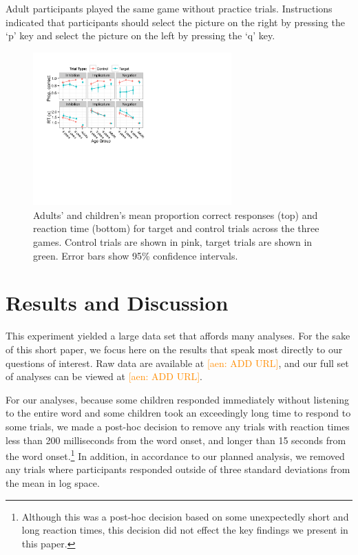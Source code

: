 \documentclass[10pt,letterpaper]{article}
\newcommand{\aen}[1]{\textcolor{DarkOrange}{[aen: #1]}}
\begin{document}
Adult participants played the same game without practice trials.  Instructions indicated that participants should select the picture on the right by pressing the `p' key and select the picture on the left by pressing the `q' key.  

\begin{figure}
\begin{center} 
\includegraphics[width=3in]{figures/correct_RT.pdf}
\caption{\label{fig:traditional} Adults' and children's mean proportion correct responses (top) and reaction time (bottom) for target and control trials across the three games.  Control trials are shown in pink, target trials are shown in green.  Error bars show 95\% confidence intervals.  }
\end{center} 
\end{figure}



\section{Results and Discussion}

This experiment yielded a large data set that affords many analyses.  For the sake of this short paper, we focus here on the results that speak most directly to our questions of interest.  Raw data are available at \aen{ADD URL}, and our full set of analyses can be viewed at \aen{ADD URL}.  

For our analyses, because some children responded immediately without listening to the entire word and some children took an exceedingly long time to respond to some trials, we made a post-hoc decision to remove any trials with reaction times less than 200 milliseconds from the word onset, and longer than 15 seconds from the word onset.\footnote{Although this was a post-hoc decision based on some unexpectedly short and long reaction times, this decision did not effect the key findings we present in this paper.}  In addition, in accordance to our planned analysis, we removed any trials where participants responded outside of three standard deviations from the mean in log space.
\end{document}
